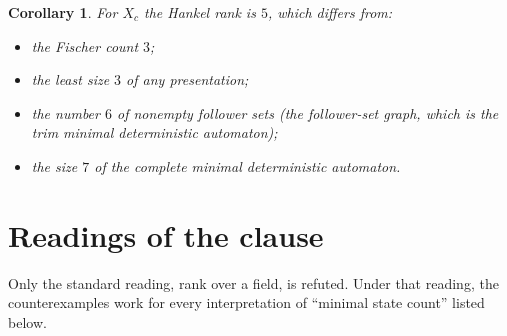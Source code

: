 \documentclass[11pt]{article}
\newtheorem{corollary}[theorem]{Corollary}
\theoremstyle{definition}
\theoremstyle{remark}
\begin{document}
\begin{corollary}\label{cor:charge}
For $X_c$ the Hankel rank is $5$, which differs from:
\begin{itemize}
\item the Fischer count $3$;
\item the least size $3$ of any presentation;
\item the number $6$ of nonempty follower sets (the follower-set graph, which is
the trim minimal deterministic automaton);
\item the size $7$ of the complete minimal deterministic automaton.
\end{itemize}
\end{corollary}

\section{Readings of the clause}

Only the standard reading, rank over a field, is refuted. Under that reading,
the counterexamples work for every interpretation of ``minimal state count''
listed below.
\end{document}
